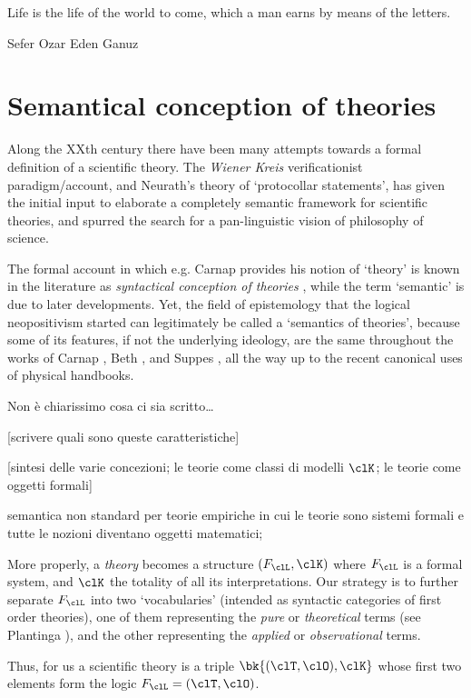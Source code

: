 \epigraph{Life is the life of the world to come, which a man earns by means of the letters.}{Sefer Ozar Eden Ganuz}
\section{Semantical conception of theories}
Along the XXth century there have been many attempts towards a formal definition of a scientific theory. The \emph{Wiener Kreis} verificationist paradigm/account, and Neurath's theory of `protocollar statements', has given the initial input to elaborate a completely semantic framework for scientific theories, and spurred the search for a pan-linguistic vision of philosophy of science.

The formal account in which e.g. Carnap \cite{?} provides his notion of `theory' is known in the literature as \emph{syntactical conception of theories} \cite{?}, while the term `semantic' is due to later developments. Yet, the field of epistemology that the logical neopositivism started can legitimately be called a `semantics of theories', because some of its features, if not the underlying ideology, are the same throughout the works of Carnap \cite{?},  Beth \cite{?}, and Suppes \cite{?}, all the way up to the recent canonical uses of physical handbooks.

{\color{red} Non è chiarissimo cosa ci sia scritto\dots}

	[scrivere quali sono queste caratteristiche]

	[sintesi delle varie concezioni; le teorie come classi di modelli $\clK$;
		le teorie come oggetti formali]

semantica non standard per teorie empiriche in cui le teorie sono sistemi formali e tutte le nozioni diventano oggetti matematici; 

More properly, a \emph{theory} becomes a structure $(F_\clL, \clK)$ where $F_\clL$ is a formal system, and $\clK$ the totality of all its interpretations. Our strategy is to further separate $F_\clL$ into two `vocabularies' (intended as syntactic categories of first order theories), one of them representing the \emph{pure} or \emph{theoretical} terms (see Plantinga \cite{}), and the other representing the \emph{applied} or \emph{observational} terms. 

Thus, for us a scientific theory is a triple $\bk{(\clT,\clO), \clK}$ whose first two elements form the logic $F_\clL=(\clT,\clO)$.%

